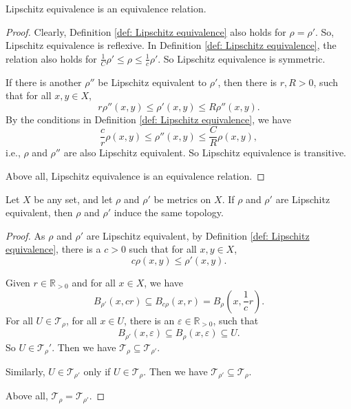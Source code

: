 \begin{proposition}
	\label{prop: Lipschitz equivalence is a equivalence relation}
	Lipschitz equivalence is an equivalence relation.
	
	\begin{proof}
		Clearly, Definition \ref{def: Lipschitz equivalence} also holds for $\rho = \rho'$. So, Lipschitz equivalence is reflexive. In Definition \ref{def: Lipschitz equivalence}, the relation also holds for $\frac{1}{C} \rho' \le \rho \le \frac{1}{c} \rho'$. So Lipschitz equivalence is symmetric.
		
		If there is another $\rho''$ be Lipschitz equivalent to $\rho'$, then there is $r, R > 0$, such that for all $x,y \in X$,
		$$
		r\rho''(x,y) \le \rho'(x,y) \le R\rho''(x,y).
		$$
		By the conditions in Definition \ref{def: Lipschitz equivalence}, we have
		$$
		\frac{c}{r} \rho(x,y) \le \rho''(x,y) \le  \frac{C}{R} \rho(x,y),
		$$
		i.e., $\rho$ and $\rho''$ are also Lipschitz equivalent. So Lipschitz equivalence is transitive.
		
		Above all, Lipschitz equivalence is an equivalence relation.
	\end{proof}
\end{proposition}


\begin{proposition}
	\label{prop: Lipschitz equivalent metrics induces the same topology}
	Let $X$ be any set, and let $\rho$ and $\rho'$ be metrics on $X$. If $\rho$ and $\rho'$ are Lipschitz equivalent, then $\rho$ and $\rho'$ induce the same topology.
	
	\begin{proof}
		As $\rho$ and $\rho'$ are Lipschitz equivalent, by Definition \ref{def: Lipschitz equivalence}, there is a $c > 0$ such that for all $x,y \in X$,
		$$
		c \rho(x,y) \le \rho'(x,y).
		$$
		
		Given $r \in \mathbb R_{> 0}$ and for all $x \in X$, we have
		$$
		B_{\rho'}(x, cr) \subseteq B_{c \rho}(x, r) = B_\rho \left( x, \frac{1}{c} r \right).
		$$
		For all $U \in \mathcal T_\rho$, for all $x \in U$, there is an $\varepsilon \in \mathbb R_{> 0}$, such that
		$$
		B_{\rho'} (x, \varepsilon) \subseteq B_{\rho}(x, \varepsilon) \subseteq U.
		$$
		So $U \in \mathcal T_\rho'$. Then we have $\mathcal T_{\rho} \subseteq \mathcal T_{\rho'}$.
		
		Similarly, $U \in \mathcal T_{\rho'}$ only if $U \in \mathcal T_\rho$. Then we have $\mathcal T_{\rho'} \subseteq \mathcal T_{\rho}$.
		
		Above all, $\mathcal T_{\rho} = \mathcal T_{\rho'}$.
	\end{proof}
\end{proposition}


